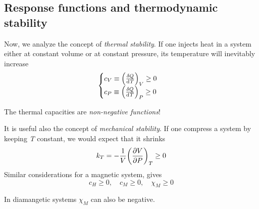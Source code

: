 \documentclass[../main/main.tex]{subfiles}
\begin{document}
\subsection{Response functions and thermodynamic stability}
Now, we analyze the concept of \textit{thermal stability}. If one injects heat in a system either at constant volume or at constant pressure, its temperature will inevitably increase
\begin{equation}
  \begin{cases}
   c_V \equiv \qty(\frac{\delta Q}{\dd[]{T} })_V \ge 0  \\
   c_P \equiv \qty(\frac{\delta Q}{\dd[]{T} })_P \ge 0
  \end{cases}
\label{eq:}
\end{equation}
\begin{remark}
The thermal capacities are \emph{non-negative functions}!
\end{remark}
It is useful also the concept of \textit{mechanical stability}. If one compress a system by keeping \emph{T} constant, we would expect that it shrinks
\begin{equation}
  k_T = - \frac{1}{V} \qty(\pdv{V}{P} )_T \ge 0
  \label{eq:}
\end{equation}
Similar considerations for a magnetic system, gives
\begin{equation}
  c_H \ge 0, \quad c_M \ge 0, \quad \chi_M \ge 0
  \label{eq:}
\end{equation}
\begin{remark}
In diamangetic systems \( \chi_M \) can also be negative.
\end{remark}
\end{document}
